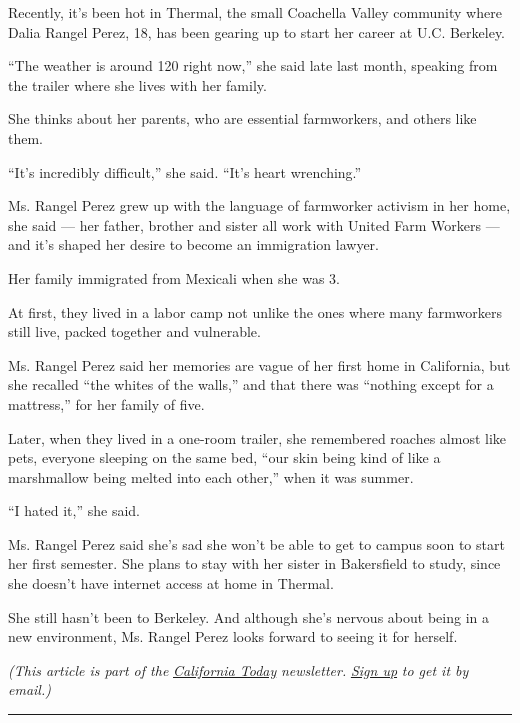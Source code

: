 Recently, it's been hot in Thermal, the small Coachella Valley community
where Dalia Rangel Perez, 18, has been gearing up to start her career at
U.C. Berkeley.

``The weather is around 120 right now,'' she said late last month,
speaking from the trailer where she lives with her family.

She thinks about her parents, who are essential farmworkers, and others
like them.

``It's incredibly difficult,'' she said. ``It's heart wrenching.''

Ms. Rangel Perez grew up with the language of farmworker activism in her
home, she said --- her father, brother and sister all work with United
Farm Workers --- and it's shaped her desire to become an immigration
lawyer.

Her family immigrated from Mexicali when she was 3.

At first, they lived in a labor camp not unlike the ones where many
farmworkers still live, packed together and vulnerable.

Ms. Rangel Perez said her memories are vague of her first home in
California, but she recalled ``the whites of the walls,'' and that there
was ``nothing except for a mattress,'' for her family of five.

Later, when they lived in a one-room trailer, she remembered roaches
almost like pets, everyone sleeping on the same bed, ``our skin being
kind of like a marshmallow being melted into each other,'' when it was
summer.

``I hated it,'' she said.

Ms. Rangel Perez said she's sad she won't be able to get to campus soon
to start her first semester. She plans to stay with her sister in
Bakersfield to study, since she doesn't have internet access at home in
Thermal.

She still hasn't been to Berkeley. And although she's nervous about
being in a new environment, Ms. Rangel Perez looks forward to seeing it
for herself.

\emph{(This article is part of the}
\href{https://www.nytimes3xbfgragh.onion/column/california-today}{\emph{California
Today}} \emph{newsletter.}
\href{https://www.nytimes3xbfgragh.onion/newsletters/california-today}{\emph{Sign
up}} \emph{to get it by email.)}

\begin{center}\rule{0.5\linewidth}{\linethickness}\end{center}

